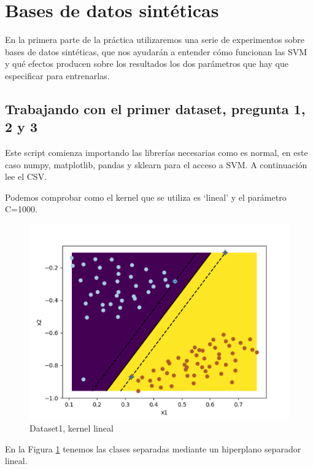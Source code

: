 \section{Bases de datos sintéticas}
En la primera parte de la práctica utilizaremos una serie de experimentos sobre bases de datos sintéticas, que nos ayudarán a entender cómo funcionan las SVM y qué efectos producen sobre los resultados los dos parámetros que hay que especificar para entrenarlas.

\subsection{Trabajando con el primer dataset, pregunta 1, 2 y 3}

Este script comienza importando las librerías necesarias como es normal, en este caso numpy, matplotlib, pandas y sklearn para el acceso a SVM.
A continuación lee el CSV.

Podemos comprobar como el kernel que se utiliza es `lineal' y el parámetro C=1000.

\begin{figure}[H]
    \centering
    \includegraphics[scale=1.2]{img/dataset1}
    \caption{Dataset1, kernel lineal}
    \label{fig:Dataset1}
\end{figure}

En la Figura \ref{fig:Dataset1} tenemos las clases separadas mediante un hiperplano separador lineal.


